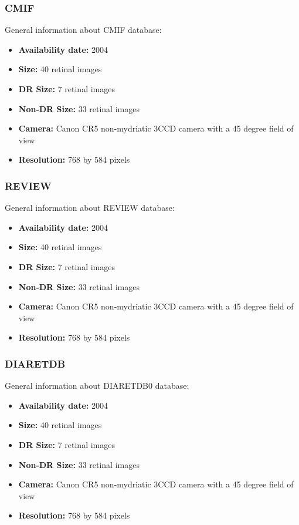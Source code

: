 \subsubsection{CMIF}
General information about CMIF database:
\begin{itemize}
    \item \textbf{Availability date: } 2004
    \item \textbf{Size: } 40 retinal images
    \item \textbf{DR Size: } 7 retinal images
    \item \textbf{Non-DR Size: } 33 retinal images
    \item \textbf{Camera: } Canon CR5 non-mydriatic 3CCD camera with a 45 degree field of view
    \item \textbf{Resolution: } 768 by 584 pixels
\end{itemize}

\subsubsection{REVIEW}
General information about REVIEW database:
\begin{itemize}
    \item \textbf{Availability date: } 2004
    \item \textbf{Size: } 40 retinal images
    \item \textbf{DR Size: } 7 retinal images
    \item \textbf{Non-DR Size: } 33 retinal images
    \item \textbf{Camera: } Canon CR5 non-mydriatic 3CCD camera with a 45 degree field of view
    \item \textbf{Resolution: } 768 by 584 pixels
\end{itemize}

\subsubsection{DIARETDB}
General information about DIARETDB0 database:
\begin{itemize}
    \item \textbf{Availability date: } 2004
    \item \textbf{Size: } 40 retinal images
    \item \textbf{DR Size: } 7 retinal images
    \item \textbf{Non-DR Size: } 33 retinal images
    \item \textbf{Camera: } Canon CR5 non-mydriatic 3CCD camera with a 45 degree field of view
    \item \textbf{Resolution: } 768 by 584 pixels
\end{itemize}

